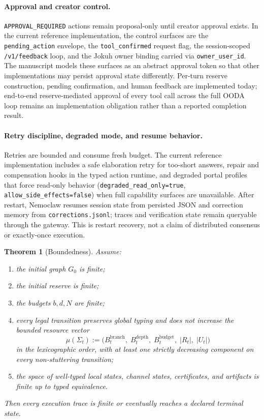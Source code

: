 \documentclass[11pt]{article}
\newtheorem{theorem}{Theorem}[section]
\theoremstyle{remark}
\begin{document}
\paragraph{Approval and creator control.}
\texttt{APPROVAL\_REQUIRED} actions remain proposal-only until creator approval exists. In the current reference implementation, the control surfaces are the \texttt{pending\_action} envelope, the \texttt{tool\_confirmed} request flag, the session-scoped \texttt{/v1/feedback} loop, and the Jokuh owner binding carried via \texttt{owner\_user\_id}. The manuscript models these surfaces as an abstract approval token so that other implementations may persist approval state differently. Per-turn reserve construction, pending confirmation, and human feedback are implemented today; end-to-end reserve-mediated approval of every tool call across the full OODA loop remains an implementation obligation rather than a reported completion result.

\paragraph{Retry discipline, degraded mode, and resume behavior.}
Retries are bounded and consume fresh budget. The current reference implementation includes a safe elaboration retry for too-short answers, repair and compensation hooks in the typed action runtime, and degraded portal profiles that force read-only behavior (\texttt{degraded\_read\_only=true}, \texttt{allow\_side\_effects=false}) when full capability surfaces are unavailable. After restart, Nemoclaw resumes session state from persisted JSON and correction memory from \texttt{corrections.jsonl}; traces and verification state remain queryable through the gateway. This is restart recovery, not a claim of distributed consensus or exactly-once execution.

\begin{theorem}[Boundedness]\label{thm:boundedness}
Assume:
\begin{enumerate}
    \item the initial graph \(G_0\) is finite;
    \item the initial reserve is finite;
    \item the budgets \(b,d,N\) are finite;
    \item every legal transition preserves global typing and does not increase the bounded resource vector
    \[
    \mu(\Sigma_t):=\bigl(B_t^{\mathrm{branch}},\; B_t^{\mathrm{depth}},\; B_t^{\mathrm{budget}},\; |R_t|,\; |U_t|\bigr)
    \]
    in the lexicographic order, with at least one strictly decreasing component on every non-stuttering transition;
    \item the space of well-typed local states, channel states, certificates, and artifacts is finite up to typed equivalence.
\end{enumerate}
Then every execution trace is finite or eventually reaches a declared terminal state.
\end{theorem}
\end{document}
